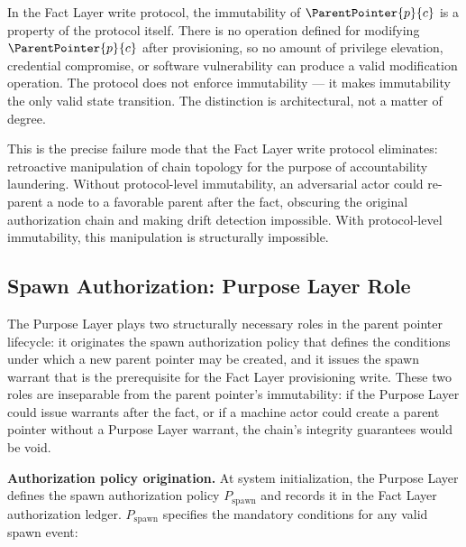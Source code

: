 In the Fact Layer write protocol, the immutability of $\ParentPointer{p}{c}$ is a property of the protocol itself. There is no operation defined for modifying $\ParentPointer{p}{c}$ after provisioning, so no amount of privilege elevation, credential compromise, or software vulnerability can produce a valid modification operation. The protocol does not enforce immutability — it makes immutability the only valid state transition. The distinction is architectural, not a matter of degree.

This is the precise failure mode that the Fact Layer write protocol eliminates: retroactive manipulation of chain topology for the purpose of accountability laundering. Without protocol-level immutability, an adversarial actor could re-parent a node to a favorable parent after the fact, obscuring the original authorization chain and making drift detection impossible. With protocol-level immutability, this manipulation is structurally impossible.

\subsection{Spawn Authorization: Purpose Layer Role}
\label{sec:purpose-layer-authorization}

The Purpose Layer plays two structurally necessary roles in the parent pointer lifecycle: it originates the spawn authorization policy that defines the conditions under which a new parent pointer may be created, and it issues the spawn warrant that is the prerequisite for the Fact Layer provisioning write. These two roles are inseparable from the parent pointer's immutability: if the Purpose Layer could issue warrants after the fact, or if a machine actor could create a parent pointer without a Purpose Layer warrant, the chain's integrity guarantees would be void.

\medskip
\noindent\textbf{Authorization policy origination.} At system initialization, the Purpose Layer defines the spawn authorization policy $P_{\mathrm{spawn}}$ and records it in the Fact Layer authorization ledger. $P_{\mathrm{spawn}}$ specifies the mandatory conditions for any valid spawn event:


